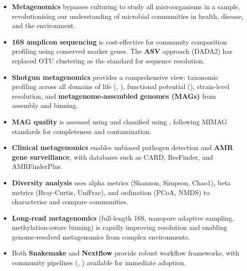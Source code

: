 \begin{keyconcept}[title={Chapter Summary}]
\begin{itemize}[nosep]
  \item \textbf{Metagenomics} bypasses culturing to study all microorganisms in a sample, revolutionising our understanding of microbial communities in health, disease, and the environment.
  \item \textbf{16S amplicon sequencing} is cost-effective for community composition profiling using conserved marker genes. The \textbf{ASV} approach (DADA2) has replaced OTU clustering as the standard for sequence resolution.
  \item \textbf{Shotgun metagenomics} provides a comprehensive view: taxonomic profiling across all domains of life (, ), functional potential (), strain-level resolution, and \textbf{metagenome-assembled genomes (MAGs)} from assembly and binning.
  \item \textbf{MAG quality} is assessed using  and classified using , following MIMAG standards for completeness and contamination.
  \item \textbf{Clinical metagenomics} enables unbiased pathogen detection and \textbf{AMR gene surveillance}, with databases such as CARD, ResFinder, and AMRFinderPlus.
  \item \textbf{Diversity analysis} uses alpha metrics (Shannon, Simpson, Chao1), beta metrics (Bray-Curtis, UniFrac), and ordination (PCoA, NMDS) to characterise and compare communities.
  \item \textbf{Long-read metagenomics} (full-length 16S, nanopore adaptive sampling, methylation-aware binning) is rapidly improving resolution and enabling genome-resolved metagenomics from complex environments.
  \item Both \textbf{Snakemake} and \textbf{Nextflow} provide robust workflow frameworks, with community pipelines (, ) available for immediate adoption.
\end{itemize}
\end{keyconcept}
